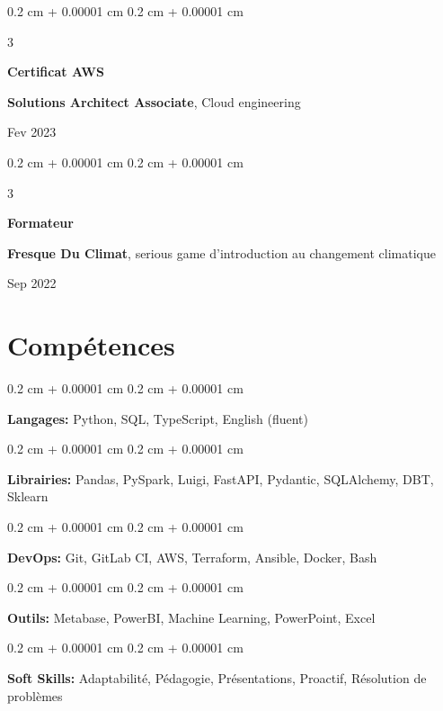 \documentclass[10pt, letterpaper]{article}
\newenvironment{onecolentry}{
    \begin{adjustwidth}{
        0.2 cm + 0.00001 cm
    }{
        0.2 cm + 0.00001 cm
    }
}{
    \end{adjustwidth}
} %
\newenvironment{threecolentry}[3][]{
    \onecolentry
    \def\thirdColumn{#3}
    \setcolumnwidth{2.5 cm, \fill, 3.5 cm}
    \begin{paracol}{3}
    {\raggedright #2} \switchcolumn
}{
    \switchcolumn \raggedleft \thirdColumn
    \end{paracol}
    \endonecolentry
} %
\begin{document}
        \begin{threecolentry}{\textbf{Certificat AWS}}{
            Fev 2023
        }
            \textbf{Solutions Architect Associate}, Cloud engineering
        \end{threecolentry}

        \vspace{0.2 cm}

        \begin{threecolentry}{\textbf{Formateur}}{
            Sep 2022
        }
            \textbf{Fresque Du Climat}, serious game d'introduction au changement climatique
        \end{threecolentry}


    
    \section{Compétences}



        
        \begin{onecolentry}
            \textbf{Langages:} Python, SQL, TypeScript, English (fluent)
        \end{onecolentry}

        \vspace{0.2 cm}

        \begin{onecolentry}
            \textbf{Librairies:} Pandas, PySpark, Luigi, FastAPI, Pydantic, SQLAlchemy, DBT, Sklearn
        \end{onecolentry}

        \vspace{0.2 cm}

        \begin{onecolentry}
            \textbf{DevOps:} Git, GitLab CI, AWS, Terraform, Ansible, Docker, Bash
        \end{onecolentry}

        \vspace{0.2 cm}

        \begin{onecolentry}
            \textbf{Outils:} Metabase, PowerBI, Machine Learning, PowerPoint, Excel
        \end{onecolentry}

        \vspace{0.2 cm}

        \begin{onecolentry}
            \textbf{Soft Skills:} Adaptabilité, Pédagogie, Présentations, Proactif, Résolution de problèmes
        \end{onecolentry}
\end{document}

